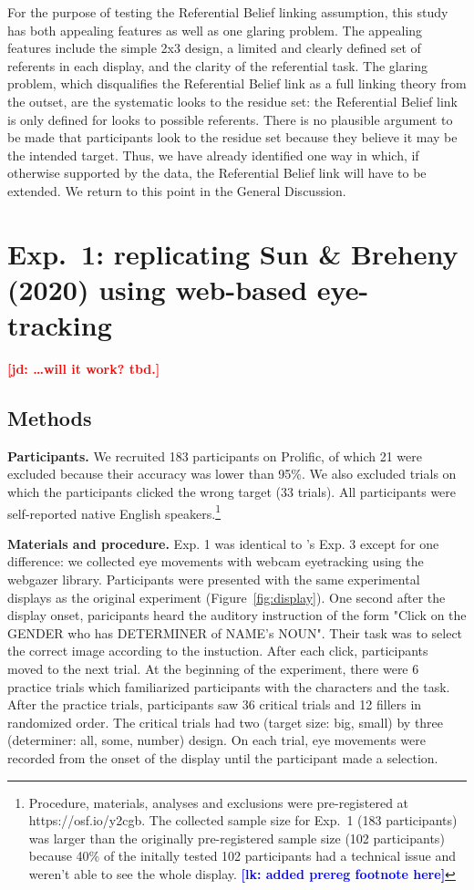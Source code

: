 \documentclass[10pt,letterpaper]{article}
\newcommand{\figref}[1]{Figure~\ref{#1}}
\newcommand{\jd}[1]{\textcolor{Red}{\textbf{[jd: #1]}}}
\newcommand{\lk}[1]{\textcolor{Blue}{\textbf{[lk: #1]}}}
\begin{document}
For the purpose of testing the Referential Belief linking assumption, this study has both appealing features as well as one glaring problem. The appealing features include the simple 2x3 design, a limited and clearly defined set of referents in each display, and the clarity of the referential task. The glaring problem, which disqualifies the Referential Belief link as a full linking theory from the outset, are the systematic looks to the residue set: the Referential Belief link is only defined for looks to possible referents. There is no plausible argument to be made that participants look to the residue set because they believe it may be the intended target.  Thus, we have already identified one way in which, if otherwise supported by the data, the Referential Belief link will have to be extended. We return to this point in the General Discussion.

\section{Exp.~1: replicating Sun \& Breheny (2020) using web-based eye-tracking}

\jd{\dots will it work? tbd.}

\subsection{Methods}

\textbf{Participants.} We recruited 183 participants on Prolific, of which 21 were excluded because their accuracy was lower than 95\%. We also excluded trials on which the participants clicked the wrong target (33 trials). All participants were self-reported native English speakers.\footnote{Procedure, materials, analyses and exclusions were pre-registered at https://osf.io/y2cgb. The collected sample size for Exp.~1 (183 participants) was larger than the originally pre-registered sample size (102 participants) because 40\% of the initally tested 102 participants had a technical issue and weren't able to see the whole display. \lk{added prereg footnote here}}

\textbf{Materials and procedure.} Exp. 1 was identical to 's Exp. 3 except for one difference: we collected eye movements with webcam eyetracking using the webgazer library. Participants were presented with the same experimental displays as the original experiment (\figref{fig:display}). One second after the display onset, paricipants heard the auditory instruction of the form "Click on the GENDER who has DETERMINER of NAME's NOUN". Their task was to select the correct image according to the instuction. After each click, participants moved to the next trial. At the beginning of the experiment, there were 6 practice trials which familiarized participants with the characters and the task. After the practice trials, participants saw 36 critical trials and 12 fillers in randomized order. The critical trials had two (target size: big, small) by three (determiner: all, some, number) design. On each trial, eye movements were recorded from the onset of the display until the participant made a selection.
\end{document}
